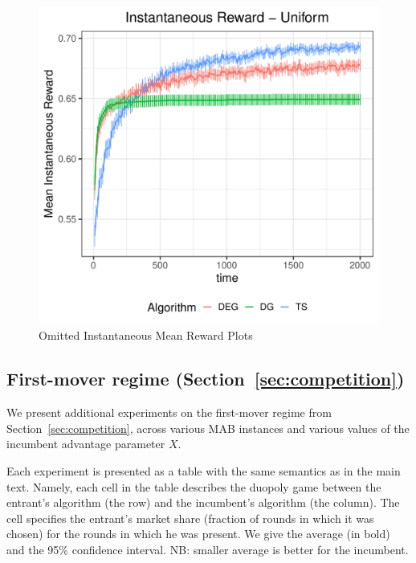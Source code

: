 \documentclass[../competing_bandits_with_appendix.tex]{subfiles}
\begin{document}
\begin{figure}[h]
\begin{center}
\includegraphics[scale=0.25]{ec19paper/appendix_figures/mean_inst_reward_uniform}
\caption{Omitted Instantaneous Mean Reward Plots}
\end{center}
\end{figure}

\subsection{First-mover regime (Section~\ref{sec:competition})}

We present additional experiments on the first-mover regime from Section~\ref{sec:competition}, across various MAB instances and various values of the incumbent advantage parameter $X$.

Each experiment is presented as a table with the same semantics as in the main text. Namely, each cell in the table describes the duopoly game between the entrant's algorithm (the row) and the incumbent's algorithm (the column). The cell specifies the entrant's market share (fraction of rounds in which it was chosen) for the rounds in which he was present. We give the average (in bold) and the 95\% confidence interval. NB: smaller average is better for the incumbent.
\end{document}

